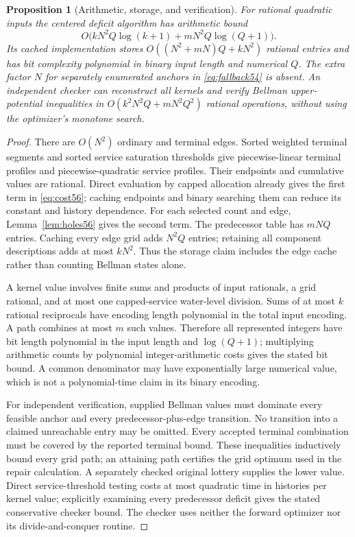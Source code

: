 \documentclass[11pt,letterpaper]{article}
\newtheorem{proposition}[theorem]{Proposition}
\theoremstyle{definition}\newtheorem{remark}[theorem]{Remark}
\begin{document}
\begin{proposition}[Arithmetic, storage, and verification]\label{prop:cost56}
For rational quadratic inputs the centered deficit algorithm has arithmetic bound
\begin{equation}\label{eq:cost56}
 O\bigl(kN^2Q\log(k+1)+mN^2Q\log(Q+1)\bigr).
\end{equation}
Its cached implementation stores $O((N^2+mN)Q+kN^2)$ rational entries and has bit complexity polynomial in binary input length and numerical $Q$. The extra factor $N$ for separately enumerated anchors in \eqref{eq:fallback54} is absent. An independent checker can reconstruct all kernels and verify Bellman upper-potential inequalities in
$O(k^2N^2Q+mN^2Q^2)$ rational operations, without using the optimizer's monotone search.
\end{proposition}
\begin{proof}
There are $O(N^2)$ ordinary and terminal edges. Sorted weighted terminal segments and sorted service saturation thresholds give piecewise-linear terminal profiles and piecewise-quadratic service profiles. Their endpoints and cumulative values are rational. Direct evaluation by capped allocation already gives the first term in \eqref{eq:cost56}; caching endpoints and binary searching them can reduce its constant and history dependence. For each selected count and edge, Lemma~\ref{lem:holes56} gives the second term. The predecessor table has $mNQ$ entries. Caching every edge grid adds $N^2Q$ entries; retaining all component descriptions adds at most $kN^2$. Thus the storage claim includes the edge cache rather than counting Bellman states alone.

A kernel value involves finite sums and products of input rationals, a grid rational, and at most one capped-service water-level division. Sums of at most $k$ rational reciprocals have encoding length polynomial in the total input encoding. A path combines at most $m$ such values. Therefore all represented integers have bit length polynomial in the input length and $\log(Q+1)$; multiplying arithmetic counts by polynomial integer-arithmetic costs gives the stated bit bound. A common denominator may have exponentially large numerical value, which is not a polynomial-time claim in its binary encoding.

For independent verification, supplied Bellman values must dominate every feasible anchor and every predecessor-plus-edge transition. No transition into a claimed unreachable entry may be omitted. Every accepted terminal combination must be covered by the reported terminal bound. These inequalities inductively bound every grid path; an attaining path certifies the grid optimum used in the repair calculation. A separately checked original lottery supplies the lower value. Direct service-threshold testing costs at most quadratic time in histories per kernel value; explicitly examining every predecessor deficit gives the stated conservative checker bound. The checker uses neither the forward optimizer nor its divide-and-conquer routine.
\end{proof}
\end{document}

